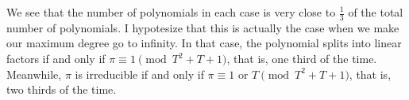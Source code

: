 \documentclass[11pt]{article}
\theoremstyle{definition}
\begin{document}
    \noindent We see that the number of polynomials in each case is very close to $\frac{1}{3}$ of the total number of polynomials.
    I hypotesize that this is actually the case when we make our maximum degree go to infinity.
    In that case, the polynomial splits into linear factors if and only if $\pi \equiv 1 \pmod{T^2 + T + 1}$, that is,
    one third of the time.
    Meanwhile, $\pi$ is irreducible if and only if $\pi \equiv 1$ or $T \pmod{T^2 + T + 1}$, that is,
    two thirds of the time.
\end{document}
